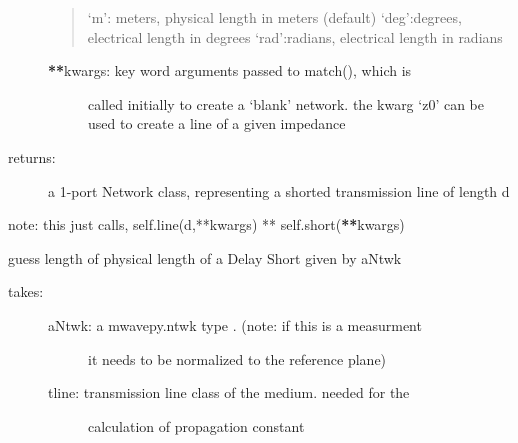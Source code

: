 \documentclass[letterpaper,10pt,english]{sphinxmanual}
\begin{document}
\begin{fulllineitems}
\begin{fulllineitems}
\begin{description}
\begin{quote}
`m': meters, physical length in meters (default)
`deg':degrees, electrical length in degrees
`rad':radians, electrical length in radians
\end{quote}
\begin{description}
\item[{{\color{red}\bfseries{}**}kwargs: key word arguments passed to match(), which is }] \leavevmode
called initially to create a `blank' network. the kwarg
`z0' can be used to create a line of a given impedance

\end{description}

\item[{returns:}] \leavevmode
a 1-port Network class, representing a shorted transmission
line of length d

\end{description}

note: this just calls,
self.line(d,**kwargs) ** self.short({\color{red}\bfseries{}**}kwargs)

\end{fulllineitems}


\begin{fulllineitems}
\label{auto_workingband:mwavepy.WorkingBand.frequency}
\end{fulllineitems}


\begin{fulllineitems}
\label{auto_workingband:mwavepy.WorkingBand.guess_length_of_delay_short}
guess length of physical length of a Delay Short given by aNtwk
\begin{description}
\item[{takes:}] \leavevmode\begin{description}
\item[{aNtwk: a mwavepy.ntwk type . (note: if this is a measurment }] \leavevmode
it needs to be normalized to the reference plane)

\item[{tline: transmission line class of the medium. needed for the }] \leavevmode
calculation of propagation constant

\end{description}


\end{description}
\end{fulllineitems}
\end{fulllineitems}
\end{document}

